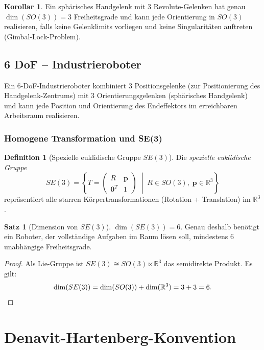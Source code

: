 ﻿\documentclass[a4paper,12pt]{article}
\theoremstyle{definition}
\newtheorem{definition}{Definition}
\newtheorem{satz}{Satz}
\newtheorem{korollar}{Korollar}
\begin{document}
\begin{korollar}
	Ein sphärisches Handgelenk mit 3 Revolute-Gelenken hat genau $\dim(SO(3)) = 3$ Freiheitsgrade und kann jede Orientierung in $SO(3)$ realisieren, falls keine Gelenklimits vorliegen und keine Singularitäten auftreten (Gimbal-Lock-Problem).
\end{korollar}

\subsection{6 DoF -- Industrieroboter}

Ein 6-DoF-Industrieroboter kombiniert 3 Positionsgelenke (zur Positionierung des Handgelenk-Zentrums) mit 3 Orientierungsgelenken (sphärisches Handgelenk) und kann jede Position und Orientierung des Endeffektors im erreichbaren Arbeitsraum realisieren.

\subsubsection{Homogene Transformation und SE(3)}

\begin{definition}[Spezielle euklidische Gruppe $SE(3)$]
	Die \emph{spezielle euklidische Gruppe}
	\[
		SE(3) = \left\{ T = \begin{pmatrix} R & \mathbf{p} \\ \mathbf{0}^T & 1 \end{pmatrix} \;\middle|\; R \in SO(3),\; \mathbf{p} \in \mathbb{R}^3 \right\}
	\]
	repräsentiert alle starren Körpertransformationen (Rotation + Translation) im $\mathbb{R}^3$.
\end{definition}

\begin{satz}[Dimension von $SE(3)$]
\label{satz:se3dim}
	$\dim(SE(3)) = 6$. Genau deshalb benötigt ein Roboter, der vollständige Aufgaben im Raum lösen soll, mindestens 6 unabhängige Freiheitsgrade.
\end{satz}

\begin{proof}
	Als Lie-Gruppe ist $SE(3) \cong SO(3) \ltimes \mathbb{R}^3$ das semidirekte Produkt. Es gilt:
	\[
		\dim(SE(3)) = \dim(SO(3)) + \dim(\mathbb{R}^3) = 3 + 3 = 6. \qedhere
	\]
\end{proof}

\section{Denavit-Hartenberg-Konvention}
\end{document}
